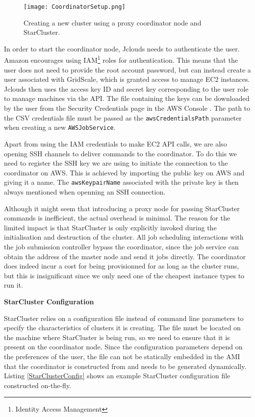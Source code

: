 \begin{figure}[h]
	\centering
		\texttt{[image: CoordinatorSetup.png]}
	\caption{Creating a new cluster using a proxy coordinator node and StarCluster.}
	\label{CoordinatorSetup}
\end{figure}

In order to start the coordinator node, Jclouds needs to authenticate the user. Amazon encourages using IAM\footnote{Identity Access Management} roles for authentication. This means that the user does not need to provide the root account password, but can instead create a user associated with GridScale, which is granted access to manage EC2 instances. Jclouds then uses the access key ID and secret key corresponding to the user role to manage machines via the API. The file containing the keys can be downloaded by the user from the Security Credentials page in the AWS Console \cite{AWSCredentials}. The path to the CSV credentials file must be passed as the \verb|awsCredentialsPath| parameter when creating a new \verb|AWSJobService|.

Apart from using the IAM credentials to make EC2 API calls, we are also opening SSH channels to deliver commands to the coordinator. To do this we need to register the SSH key we are using to initiate the connection to the coordinator on AWS. This is achieved by importing the public key on AWS and giving it a name. The \verb|awsKeypairName| associated with the private key is then always mentioned when openning an SSH connection.

Although it might seem that introducing a proxy node for passing StarCluster commands is inefficient, the actual overhead is minimal. The reason for the limited impact is that StarCluster is only explicitly invoked during the initialisation and destruction of the cluster. All job scheduling interactions with the job submission controller bypass the coordinator, since the job service can obtain the address of the master node and send it jobs directly. The coordinator does indeed incur a cost for being provisionned for as long as the cluster runs, but this is insignificant since we only need one of the cheapest instance types to run it.

\vspace{3mm}
\textbf{StarCluster Configuration}
\vspace{1mm}

StarCluster relies on a configuration file instead of command line parameters to specify the characteristics of clusters it is creating. The file must be located on the machine where StarCluster is being run, so we need to ensure that it is present on the coordinator node. Since the configuration parameters depend on the preferences of the user, the file can not be statically embedded in the AMI that the coordinator is constructed from and needs to be generated dynamically. Listing \ref{StarClusterConfig} shows an example StarCluster configuration file constructed on-the-fly.

